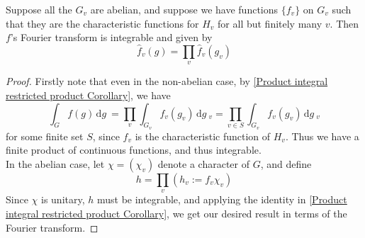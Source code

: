\documentclass[11pt, x11names, openany]{book}
\renewcommand{\brack}[1]{\left(   #1 \right)}
\renewcommand{\hat}{\widehat}
\newcommand{\dg}{\, \mathrm{d}g \ }
\begin{document}
\begin{prop}
\label{Fourier Transform on restricted product is integrable}
Suppose all the $G_v$ are abelian, and suppose we have functions $\{f_v\}$ on $G_v$ such that they are the characteristic functions for $H_v$ for all but finitely many $v$. Then $f$'s Fourier transform is integrable and given by
\begin{equation*}
    \hat{f}_v(g) = \prod_v \hat{f}_v(g_v)
\end{equation*}
\end{prop}
\begin{proof}
Firstly note that even in the non-abelian case, by \ref{Product integral restricted product Corollary}, we have 
\begin{equation*}
    \int_G f(g) \dg = \prod_v \int_{G_v}f_v(g_v) \dg_v = \prod_{v \in S} \int_{G_v} f_v(g_v) \dg_v
\end{equation*}
for some finite set $S$, since $f_v$ is the characteristic function of $H_v$. Thus we have a finite product of continuous functions, and thus integrable.\\
In the abelian case, let $\chi = (\chi_v)$ denote a character of $G$, and define
\begin{equation*}
    h = \prod_v \brack{h_v := f_v\chi_v}
\end{equation*}
Since $\chi$ is unitary, $h$ must be integrable, and applying the identity in \ref{Product integral restricted product Corollary}, we get our desired result in terms of the Fourier transform.
\end{proof}
\end{document}
